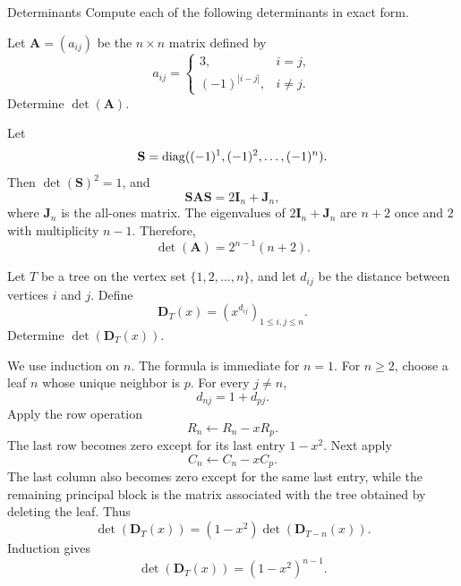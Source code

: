     \begin{expectedproblemgroup}{Determinants}
        Compute each of the following determinants in exact form.

        \begin{expectedsubproblem}
            Let $\mathbf{A}=(a_{ij})$ be the $n\times n$ matrix defined by
            \[
                a_{ij}
                =
                \begin{cases}
                    3, & i=j,\\
                    (-1)^{|i-j|}, & i\neq j.
                \end{cases}
            \]
            Determine $\det(\mathbf{A})$.
        \end{expectedsubproblem}

        \begin{expectedsubsolution}
            Let
            \[
                \mathbf{S}=\operatorname{diag}((-1)^1,(-1)^2,\ldots,(-1)^n).
            \]
            Then $\det(\mathbf{S})^2=1$, and
            \[
                \mathbf{S}\mathbf{A}\mathbf{S}
                =
                2\mathbf{I}_n+\mathbf{J}_n,
            \]
            where $\mathbf{J}_n$ is the all-ones matrix. The eigenvalues of
            $2\mathbf{I}_n+\mathbf{J}_n$ are $n+2$ once and $2$ with multiplicity
            $n-1$. Therefore,
            \[
                \boxed{\det(\mathbf{A})=2^{n-1}(n+2)}.
            \]
        \end{expectedsubsolution}

        \begin{expectedsubproblem}
            Let $T$ be a tree on the vertex set $\{1,2,\ldots,n\}$, and let
            $d_{ij}$ be the distance between vertices $i$ and $j$. Define
            \[
                \mathbf{D}_T(x)=\left(x^{d_{ij}}\right)_{1\leq i,j\leq n}.
            \]
            Determine $\det(\mathbf{D}_T(x))$.
        \end{expectedsubproblem}

        \begin{expectedsubsolution}
            We use induction on $n$. The formula is immediate for $n=1$. For
            $n\geq2$, choose a leaf $n$ whose unique neighbor is $p$. For every
            $j\neq n$,
            \[
                d_{nj}=1+d_{pj}.
            \]
            Apply the row operation
            \[
                R_n\longleftarrow R_n-xR_p.
            \]
            The last row becomes zero except for its last entry $1-x^2$. Next apply
            \[
                C_n\longleftarrow C_n-xC_p.
            \]
            The last column also becomes zero except for the same last entry, while
            the remaining principal block is the matrix associated with the tree
            obtained by deleting the leaf. Thus
            \[
                \det(\mathbf{D}_T(x))
                =
                (1-x^2)\det(\mathbf{D}_{T-n}(x)).
            \]
            Induction gives
            \[
                \boxed{
                    \det(\mathbf{D}_T(x))=(1-x^2)^{n-1}
                }.
            \]
        \end{expectedsubsolution}


\end{expectedproblemgroup}
